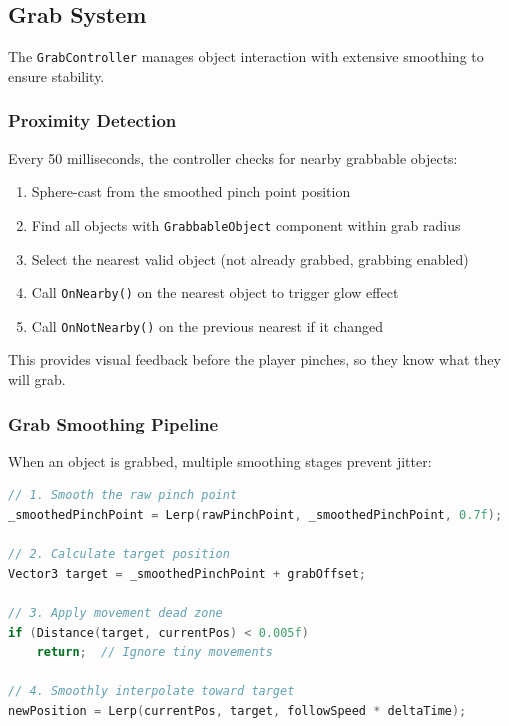 \documentclass[11pt]{article}
\begin{document}
\subsection{Grab System}

The \texttt{GrabController} manages object interaction with extensive smoothing to ensure stability.

\subsubsection{Proximity Detection}

Every 50 milliseconds, the controller checks for nearby grabbable objects:

\begin{enumerate}
    \item Sphere-cast from the smoothed pinch point position
    \item Find all objects with \texttt{GrabbableObject} component within grab radius
    \item Select the nearest valid object (not already grabbed, grabbing enabled)
    \item Call \texttt{OnNearby()} on the nearest object to trigger glow effect
    \item Call \texttt{OnNotNearby()} on the previous nearest if it changed
\end{enumerate}

This provides visual feedback before the player pinches, so they know what they will grab.


\subsubsection{Grab Smoothing Pipeline}

When an object is grabbed, multiple smoothing stages prevent jitter:

\begin{lstlisting}[language=C, caption=Smoothed Object Following]
// 1. Smooth the raw pinch point
_smoothedPinchPoint = Lerp(rawPinchPoint, _smoothedPinchPoint, 0.7f);

// 2. Calculate target position
Vector3 target = _smoothedPinchPoint + grabOffset;

// 3. Apply movement dead zone
if (Distance(target, currentPos) < 0.005f)
    return;  // Ignore tiny movements

// 4. Smoothly interpolate toward target
newPosition = Lerp(currentPos, target, followSpeed * deltaTime);
\end{lstlisting}
\end{document}
